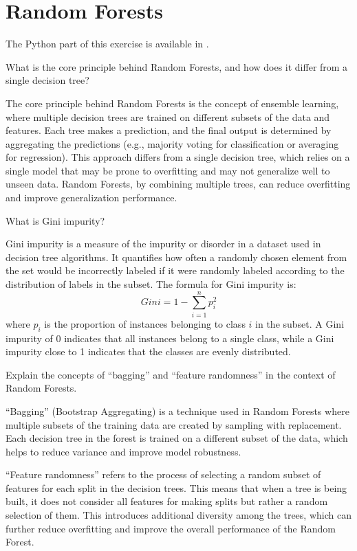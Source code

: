 \section{Random Forests}

The Python part of this exercise is available in .\\

\begin{ejercicio}
    What is the core principle behind Random Forests, and how does it differ from a single decision tree?

    The core principle behind Random Forests is the concept of ensemble learning, where multiple decision trees are trained on different subsets of the data and features. Each tree makes a prediction, and the final output is determined by aggregating the predictions (e.g., majority voting for classification or averaging for regression). This approach differs from a single decision tree, which relies on a single model that may be prone to overfitting and may not generalize well to unseen data. Random Forests, by combining multiple trees, can reduce overfitting and improve generalization performance.
\end{ejercicio}

\begin{ejercicio}
    What is Gini impurity?

    Gini impurity is a measure of the impurity or disorder in a dataset used in decision tree algorithms. It quantifies how often a randomly chosen element from the set would be incorrectly labeled if it were randomly labeled according to the distribution of labels in the subset. The formula for Gini impurity is:
    \[Gini = 1 - \sum_{i=1}^{n} p_i^2\]
    where \(p_i\) is the proportion of instances belonging to class \(i\) in the subset. A Gini impurity of 0 indicates that all instances belong to a single class, while a Gini impurity close to 1 indicates that the classes are evenly distributed.
\end{ejercicio}

\begin{ejercicio}
    Explain the concepts of ``bagging'' and ``feature randomness'' in the context of Random Forests.

    ``Bagging'' (Bootstrap Aggregating) is a technique used in Random Forests where multiple subsets of the training data are created by sampling with replacement. Each decision tree in the forest is trained on a different subset of the data, which helps to reduce variance and improve model robustness. 

    ``Feature randomness'' refers to the process of selecting a random subset of features for each split in the decision trees. This means that when a tree is being built, it does not consider all features for making splits but rather a random selection of them. This introduces additional diversity among the trees, which can further reduce overfitting and improve the overall performance of the Random Forest.
\end{ejercicio}

